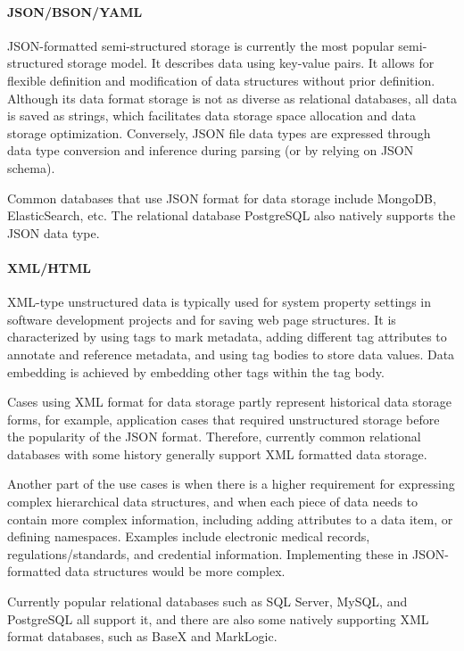 \documentclass{article}
\begin{document}
\paragraph{JSON/BSON/YAML} 
JSON-formatted semi-structured storage is currently the most popular semi-structured storage model. It describes data using key-value pairs. It allows for flexible definition and modification of data structures without prior definition. Although its data format storage is not as diverse as relational databases, all data is saved as strings, which facilitates data storage space allocation and data storage optimization.
Conversely, JSON file data types are expressed through data type conversion and inference during parsing (or by relying on JSON schema).

Common databases that use JSON format for data storage include MongoDB, ElasticSearch, etc. The relational database PostgreSQL also natively supports the JSON data type.

\paragraph{XML/HTML} 
XML-type unstructured data is typically used for system property settings in software development projects and for saving web page structures. It is characterized by using tags to mark metadata, adding different tag attributes to annotate and reference metadata, and using tag bodies to store data values.
Data embedding is achieved by embedding other tags within the tag body.

Cases using XML format for data storage partly represent historical data storage forms, for example, application cases that required unstructured storage before the popularity of the JSON format. Therefore, currently common relational databases with some history generally support XML formatted data storage.

Another part of the use cases is when there is a higher requirement for expressing complex hierarchical data structures, and when each piece of data needs to contain more complex information, including adding attributes to a data item, or defining namespaces. Examples include electronic medical records, regulations/standards, and credential information. Implementing these in JSON-formatted data structures would be more complex.

Currently popular relational databases such as SQL Server, MySQL, and PostgreSQL all support it, and there are also some natively supporting XML format databases, such as BaseX and MarkLogic.
\end{document}
